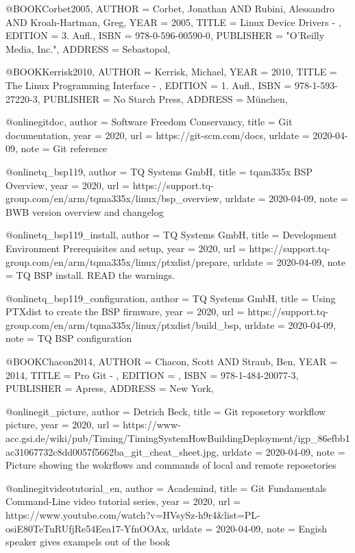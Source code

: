 @BOOK{Corbet2005,
	AUTHOR = {Corbet, Jonathan AND Rubini, Alessandro AND Kroah-Hartman, Greg},
	YEAR = {2005},
	TITLE = {Linux Device Drivers - },
	EDITION = {3. Aufl.},
	ISBN = {978-0-596-00590-0},
	PUBLISHER = {"O'Reilly Media, Inc."},
	ADDRESS = {Sebastopol},
}

@BOOK{Kerrisk2010,
	AUTHOR = {Kerrisk, Michael},
	YEAR = {2010},
	TITLE = {The Linux Programming Interface - },
	EDITION = {1. Aufl.},
	ISBN = {978-1-593-27220-3},
	PUBLISHER = {No Starch Press},
	ADDRESS = {München},
}



@online{gitdoc,
author = {Software Freedom Conservancy},
title = {Git documentation},
year = 2020,
url = {https://git-scm.com/docs},
urldate = {2020-04-09},
note = {Git reference}
}

@online{tq_bsp119,
author = {TQ Systems GmbH},
title = {tqam335x BSP Overview},
year = 2020,
url = {https://support.tq-group.com/en/arm/tqma335x/linux/bsp_overview},
urldate = {2020-04-09},
note = {BWB version overview and changelog}
}

@online{tq_bsp119_install,
author = {TQ Systems GmbH},
title = {Development Environment Prerequisites and setup},
year = 2020,
url = {https://support.tq-group.com/en/arm/tqma335x/linux/ptxdist/prepare},
urldate = {2020-04-09},
note = {TQ BSP install. READ the warnings.}
}

@online{tq_bsp119_configuration,
author = {TQ Systems GmbH},
title = {Using PTXdist to create the BSP firmware},
year = 2020,
url = {https://support.tq-group.com/en/arm/tqma335x/linux/ptxdist/build_bsp},
urldate = {2020-04-09},
note = {TQ BSP configuration}
}

@BOOK{Chacon2014,
	AUTHOR = {Chacon, Scott AND Straub, Ben},
	YEAR = {2014},
	TITLE = {Pro Git - },
	EDITION = {},
	ISBN = {978-1-484-20077-3},
	PUBLISHER = {Apress},
	ADDRESS = {New York},
}

@online{git_picture,
author = {Detrich Beck},
title = {Git reposetory workflow picture},
year = 2020,
url =
{https://www-acc.gsi.de/wiki/pub/Timing/TimingSystemHowBuildingDeployment/igp_86efbb1ac31067732c8dd0057f5662ba_git_cheat_sheet.jpg},
urldate = {2020-04-09},
note = {Picture showing the wokrflows and commands of local and remote
    reposetories}
}

@online{gitvideotutorial_en,
author = {Academind},
title = {Git Fundamentals Command-Line video tutorial series},
year = 2020,
url = {https://www.youtube.com/watch?v=HVsySz-h9r4&list=PL-osiE80TeTuRUfjRe54Eea17-YfnOOAx},
urldate = {2020-04-09},
note = {Engish speaker gives exampels out of the book~\cite{Chacon2014}}
}


